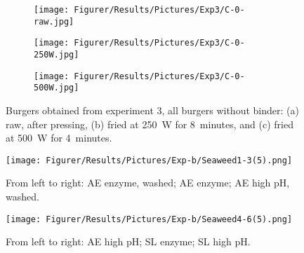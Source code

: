\begin{figure}[H]
\captionsetup[subfigure]{justification=Centering}

\begin{subfigure}[t]{0.3\textwidth}
    \texttt{[image: Figurer/Results/Pictures/Exp3/C-0-raw.jpg]}
    \caption{}
\end{subfigure}\hspace{\fill} %
\begin{subfigure}[t]{0.3\textwidth}
    \texttt{[image: Figurer/Results/Pictures/Exp3/C-0-250W.jpg]}
    \caption{}
\end{subfigure}\hspace{\fill} %
\begin{subfigure}[t]{0.3\textwidth}
    \texttt{[image: Figurer/Results/Pictures/Exp3/C-0-500W.jpg]}
    \caption{}
\end{subfigure}

\caption{Burgers obtained from experiment 3, all burgers without binder: (a) raw, after pressing, (b) fried at 250~W for 8~minutes, and (c) fried at 500~W for 4~minutes.} 
\label{fig:Burgers:Exp3}
\end{figure}


\begin{figure}[H]
    \centering
    \texttt{[image: Figurer/Results/Pictures/Exp-b/Seaweed1-3(5).png]}
    \caption{From left to right: AE enzyme, washed; AE enzyme; AE high pH, washed.}
    \label{fig:Results:SubExpSeaweed1-3}
\end{figure}

\begin{figure}[H]
    \centering
    \texttt{[image: Figurer/Results/Pictures/Exp-b/Seaweed4-6(5).png]}
    \caption{From left to right: AE high pH; SL enzyme; SL high pH.}
    \label{fig:Results:SubExpSeaweed4-6}
\end{figure}


